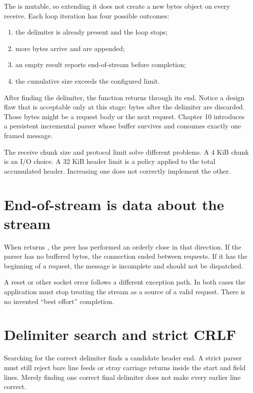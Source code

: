 The  is mutable, so extending it does not create a new bytes
object on every receive. Each loop iteration has four possible outcomes:

\begin{enumerate}
  \item the delimiter is already present and the loop stops;
  \item more bytes arrive and are appended;
  \item an empty result reports end-of-stream before completion;
  \item the cumulative size exceeds the configured limit.
\end{enumerate}

After finding the delimiter, the function returns through its end. Notice a
design flaw that is acceptable only at this stage: bytes after the delimiter
are discarded. Those bytes might be a request body or the next request. Chapter
10 introduces a persistent incremental parser whose buffer survives and consumes
exactly one framed message.

\begin{pitfall}
The receive chunk size and protocol limit solve different problems. A 4 KiB
chunk is an I/O choice. A 32 KiB header limit is a policy applied to the total
accumulated header. Increasing one does not correctly implement the other.
\end{pitfall}

\section{End-of-stream is data about the stream}

When  returns , the peer has performed an orderly close in
that direction. If the parser has no buffered bytes, the connection ended
between requests. If it has the beginning of a request, the message is incomplete
and should not be dispatched.

A reset or other socket error follows a different exception path. In both cases
the application must stop treating the stream as a source of a valid request.
There is no invented ``best effort'' completion.

\section{Delimiter search and strict CRLF}

Searching for the correct delimiter finds a candidate header end. A strict parser
must still reject bare line feeds or stray carriage returns inside the start and
field lines. Merely finding one correct final delimiter does not make every
earlier line correct.

